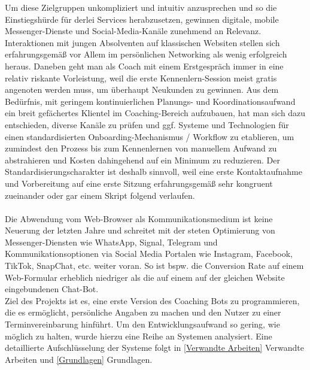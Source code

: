         Um diese Zielgruppen unkompliziert und intuitiv anzusprechen und so die Einstiegshürde für derlei Services herabzusetzen, gewinnen digitale, mobile Messenger-Dienste und Social-Media-Kanäle zunehmend an Relevanz. Interaktionen mit jungen Absolventen auf klassischen Websiten stellen sich erfahrungsgemäß vor Allem im persönlichen Networking als wenig erfolgreich heraus. Daneben geht man als Coach mit einem Erstgespräch immer in eine relativ riskante Vorleistung, weil die erste Kennenlern-Session meist gratis angenoten werden muss, um überhaupt Neukunden zu gewinnen. 
        Aus dem Bedürfnis, mit geringem kontinuierlichen Planungs- und Koordinationsaufwand ein breit gefächertes Klientel im Coaching-Bereich aufzubauen, hat man sich dazu entschieden, diverse Kanäle zu prüfen und ggf. Systeme und Technologien für einen standardisierten Onboarding-Mechanismus / Workflow zu etablieren, um zumindest den Prozess bis zum Kennenlernen von manuellem Aufwand zu abstrahieren und Kosten dahingehend auf ein Minimum zu reduzieren. Der Standardisierungscharakter ist deshalb sinnvoll, weil eine erste Kontaktaufnahme und Vorbereitung auf eine erste Sitzung erfahrungsgemäß sehr kongruent zueinander oder gar einem Skript folgend verlaufen. \\
        \\
        Die Abwendung vom Web-Browser als Kommunikationsmedium ist keine Neuerung der letzten Jahre und schreitet mit der steten Optimierung von Messenger-Diensten wie WhatsApp, Signal, Telegram und Kommunikationsoptionen via Social Media Portalen wie Instagram, Facebook, TikTok, SnapChat, etc. weiter voran. So ist bspw. die Conversion Rate auf einem Web-Formular erheblich niedriger als die auf einem auf der gleichen Website eingebundenen Chat-Bot. 
        \\
        Ziel des Projekts ist es, eine erste Version des Coaching Bots zu programmieren, die es ermöglicht, persönliche Angaben zu machen und den Nutzer zu einer Terminvereinbarung hinführt. Um den Entwicklungsaufwand so gering, wie möglich zu halten, wurde hierzu eine Reihe an Systemen analysiert. Eine detaillierte Aufschlüsselung der Systeme folgt in \ref{Verwandte Arbeiten} Verwandte Arbeiten und \ref{Grundlagen} Grundlagen.

